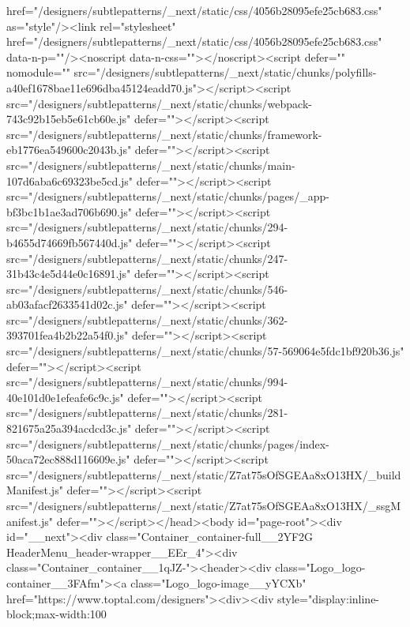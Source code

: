 href="/designers/subtlepatterns/_next/static/css/4056b28095efe25cb683.css" as="style"/><link rel="stylesheet" href="/designers/subtlepatterns/_next/static/css/4056b28095efe25cb683.css" data-n-p=""/><noscript data-n-css=""></noscript><script defer="" nomodule="" src="/designers/subtlepatterns/_next/static/chunks/polyfills-a40ef1678bae11e696dba45124eadd70.js"></script><script src="/designers/subtlepatterns/_next/static/chunks/webpack-743c92b15eb5e61cb60e.js" defer=""></script><script src="/designers/subtlepatterns/_next/static/chunks/framework-eb1776ea549600c2043b.js" defer=""></script><script src="/designers/subtlepatterns/_next/static/chunks/main-107d6aba6c69323be5cd.js" defer=""></script><script src="/designers/subtlepatterns/_next/static/chunks/pages/_app-bf3bc1b1ae3ad706b690.js" defer=""></script><script src="/designers/subtlepatterns/_next/static/chunks/294-b4655d74669fb567440d.js" defer=""></script><script src="/designers/subtlepatterns/_next/static/chunks/247-31b43c4e5d44e0c16891.js" defer=""></script><script src="/designers/subtlepatterns/_next/static/chunks/546-ab03afacf2633541d02c.js" defer=""></script><script src="/designers/subtlepatterns/_next/static/chunks/362-393701fea4b2b22a54f0.js" defer=""></script><script src="/designers/subtlepatterns/_next/static/chunks/57-569064e5fdc1bf920b36.js" defer=""></script><script src="/designers/subtlepatterns/_next/static/chunks/994-40e101d0e1efeafe6c9c.js" defer=""></script><script src="/designers/subtlepatterns/_next/static/chunks/281-821675a25a394acdcd3c.js" defer=""></script><script src="/designers/subtlepatterns/_next/static/chunks/pages/index-50aca72ec888d116609e.js" defer=""></script><script src="/designers/subtlepatterns/_next/static/Z7at75sOfSGEAa8xO13HX/_buildManifest.js" defer=""></script><script src="/designers/subtlepatterns/_next/static/Z7at75sOfSGEAa8xO13HX/_ssgManifest.js" defer=""></script></head><body id="page-root"><div id="__next"><div class="Container_container-full__2YF2G HeaderMenu_header-wrapper__EEr_4"><div class="Container_container__1qJZ-"><header><div class="Logo_logo-container__3FAfm"><a class="Logo_logo-image__yYCXb" href="https://www.toptal.com/designers"><div><div style="display:inline-block;max-width:100%
